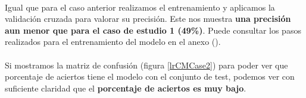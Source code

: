 \paragraph{}
Igual que para el caso anterior realizamos el entrenamiento y aplicamos la validación cruzada para valorar su precisión. Este nos muestra \textbf{una precisión aun menor que para el caso de estudio 1 (49\%)}. Puede consultar los pasos realizados para el entrenamiento del modelo en el anexo ().

\paragraph{}
Si mostramos la matriz de confusión\cite{ref:confusion_matrix} (figura \ref{lrCMCase2}) para poder ver que porcentaje de aciertos tiene el modelo con el conjunto de test, podemos ver con suficiente claridad que el \textbf{porcentaje de aciertos es muy bajo}.

